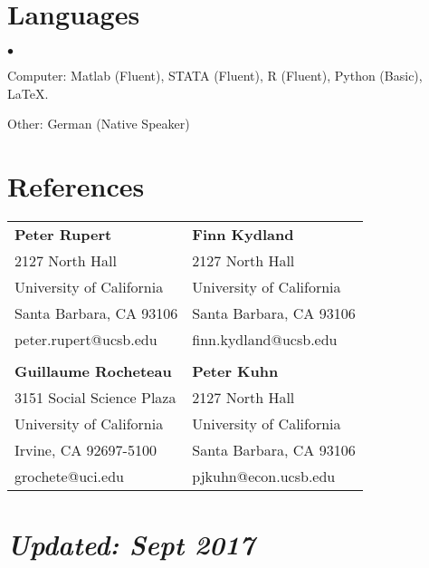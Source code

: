 \documentclass[margin,line]{res}
\newenvironment{list2}{
  \begin{list}{$\bullet$}{%
      \setlength{\itemsep}{0.05in}
      \setlength{\parsep}{0in} \setlength{\parskip}{0in}
      \setlength{\topsep}{0in} \setlength{\partopsep}{0in} 
      \setlength{\leftmargin}{0.2in}}}{\end{list}}
\begin{document}
\begin{resume}
\section{\sc Languages} 
\begin{list2}
\item Computer:  Matlab (Fluent), STATA (Fluent), R (Fluent), Python (Basic), \LaTeX.
\item Other:  German (Native Speaker)
\end{list2}

\section{\sc References}
\begin{tabular}{p{5cm}p{5cm}}
 \textbf{Peter Rupert} &\textbf{Finn Kydland}\\
 2127 North Hall  &  2127 North Hall \\
 University of California & University of California\\
 Santa Barbara, CA 93106 &  Santa Barbara, CA 93106\\
 peter.rupert@ucsb.edu & finn.kydland@ucsb.edu\\
 &\\
 \textbf{Guillaume Rocheteau} & \textbf{Peter Kuhn}\\
 3151 Social Science Plaza & 2127 North Hall\\
 University of California & University of California\\
 Irvine, CA 92697-5100 & Santa Barbara, CA 93106\\
 grochete@uci.edu & pjkuhn@econ.ucsb.edu

\end{tabular}
\vspace{2em}
\section{\it Updated: Sept 2017}

\end{resume}
\end{document}

